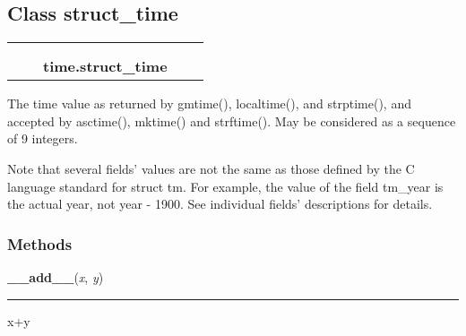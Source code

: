 
\subsection{Class struct\_time}

    \label{time:struct_time}
\begin{tabular}{cccccc}
\multicolumn{2}{r}{\settowidth{\BCL}{object}\multirow{2}{\BCL}{object}}
&&
  \\\cline{3-3}
  &&\multicolumn{1}{c|}{}
&&
  \\
&&\multicolumn{2}{l}{\textbf{time.struct\_time}}
\end{tabular}

The time value as returned by gmtime(), localtime(), and strptime(), and 
accepted by asctime(), mktime() and strftime().  May be considered as a 
sequence of 9 integers.

Note that several fields' values are not the same as those defined by the C
language standard for struct tm.  For example, the value of the field 
tm\_year is the actual year, not year - 1900.  See individual fields' 
descriptions for details.



  \subsubsection{Methods}

    \label{time:struct_time:__add__}

    \vspace{0.5ex}

\hspace{.8\funcindent}\begin{boxedminipage}{\funcwidth}

    \raggedright \textbf{\_\_add\_\_}(\textit{x}, \textit{y})

    \vspace{-1.5ex}

    \rule{\textwidth}{0.5\fboxrule}
\setlength{\parskip}{2ex}
    x+y

\setlength{\parskip}{1ex}
    \end{boxedminipage}

